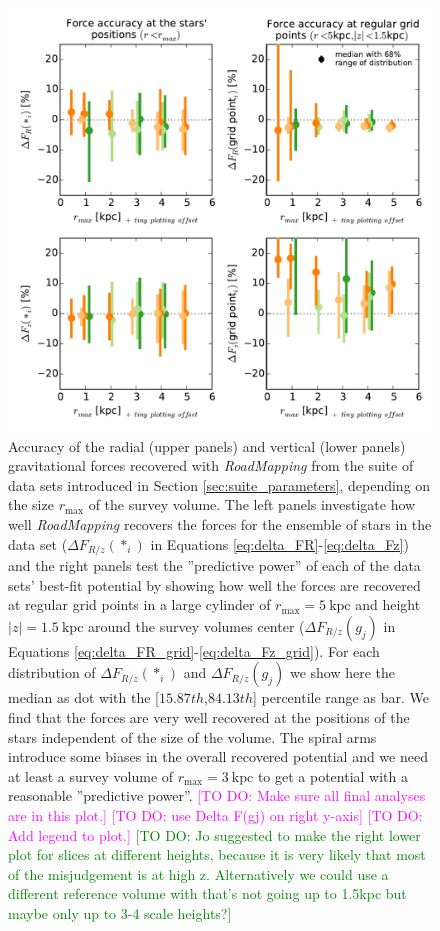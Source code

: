 \documentclass[iop,revtex4,numberedappendix,appendixfloats]{emulateapj}
\newcommand{\RM}{{\sl RoadMapping}}
\newcommand{\Wilma}[1]{\textcolor{Magenta}{#1}}
\newcommand{\HW}[1]{\textcolor{Green}{#1}}
\begin{document}
\begin{figure}[!htbp]
\centering
\includegraphics[width=\columnwidth]{fig/MNdHHdiffSph2_bias_in_forces_recovery.pdf}
\caption{Accuracy of the radial (upper panels) and vertical (lower panels) gravitational forces recovered with \RM{} from the suite of data sets introduced in Section \ref{sec:suite_parameters}, depending on the size $r_\text{max}$ of the survey volume. The left panels investigate how well \RM{} recovers the forces for the ensemble of stars in the data set ($\Delta F_{R/z}(*_i)$ in Equations \eqref{eq:delta_FR}-\eqref{eq:delta_Fz}) and the right panels test the ''predictive power'' of each of the data sets' best-fit potential by showing how well the forces are recovered at regular grid points in a large cylinder of $r_\text{max}=5~\text{kpc}$ and height $|z|=1.5~\text{kpc}$ around the survey volumes center ($\Delta F_{R/z}(g_j)$ in Equations \eqref{eq:delta_FR_grid}-\eqref{eq:delta_Fz_grid}). For each distribution of $\Delta F_{R/z}(*_i)$ and $\Delta F_{R/z}(g_j)$ we show here the median as dot with the  [$15.87th$,$84.13th$] percentile range as bar. We find that the forces are very well recovered at the positions of the stars independent of the size of the volume. The spiral arms introduce some biases in the overall recovered potential and we need at least a survey volume of $r_\text{max}=3~\text{kpc}$ to get a potential with a reasonable ''predictive power''. \Wilma{[TO DO: Make sure all final analyses are in this plot.]} \Wilma{[TO DO: use Delta F(gj) on right y-axis]} \Wilma{[TO DO: Add legend to plot.]} \HW{[TO DO: Jo suggested to make the right lower plot for slices at different heights, because it is very likely that most of the misjudgement is at high z. Alternatively we could use a different reference volume with that's not going up to 1.5kpc but maybe only up to 3-4 scale heights?]}}
\label{fig:forces_bias}
\end{figure}
\end{document}
